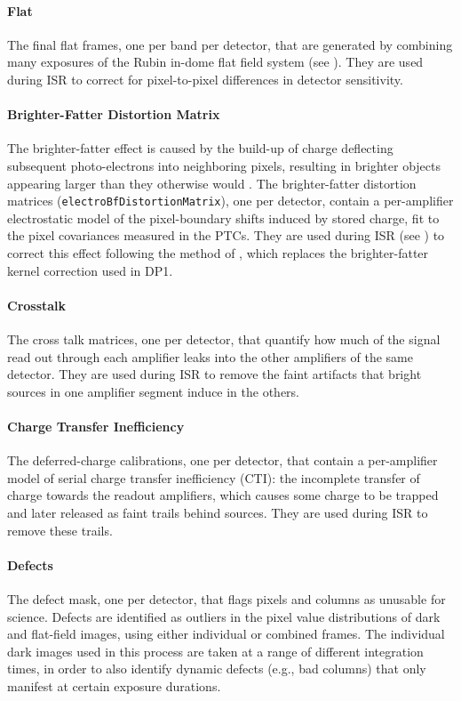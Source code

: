 \paragraph{Flat}
The final flat frames, one per band per detector, that are generated by combining many exposures of the Rubin in-dome flat field system (see ).
They are used during \gls{ISR} to correct for pixel-to-pixel differences in detector sensitivity.
\paragraph{Brighter-Fatter Distortion Matrix}
The brighter-fatter effect is caused by the build-up of charge deflecting subsequent photo-electrons into neighboring pixels, resulting in brighter objects appearing larger than they otherwise would \citep[][]{2015JInst..10C5032G, 2023A&A...670A.118A, 2024PASP..136d5003B}.
The brighter-fatter distortion matrices (\texttt{electroBfDistortionMatrix}), one per detector, contain a per-amplifier electrostatic model of the pixel-boundary shifts induced by stored charge, fit to the pixel covariances measured in the \glspl{PTC}.
They are used during \gls{ISR} (see ) to correct this effect following the method of \citet[][]{2023A&A...670A.118A}, which replaces the brighter-fatter kernel correction used in \gls{DP1}.

\paragraph{Crosstalk}
The cross talk matrices, one per detector, that quantify how much of the signal read out through each amplifier leaks into the other amplifiers of the same detector.
They are used during \gls{ISR} to remove the faint artifacts that bright sources in one amplifier segment induce in the others.
\paragraph{Charge Transfer Inefficiency}
The deferred-charge calibrations, one per detector, that contain a per-amplifier model of serial charge transfer inefficiency (\gls{CTI}): the incomplete transfer of charge towards the readout amplifiers, which causes some charge to be trapped and later released as faint trails behind sources.
They are used during \gls{ISR} to remove these trails.
\paragraph{Defects}
The defect mask, one per detector, that flags pixels and columns as unusable for science.
Defects are identified as outliers in the pixel value distributions of dark and flat-field images, using either individual or combined frames.
The individual dark images used in this process are taken at a range of different integration times, in order to also identify dynamic defects (e.g., bad columns) that only manifest at certain exposure durations.

